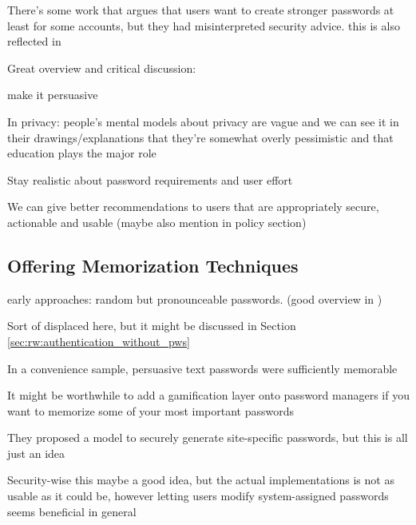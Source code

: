 	There's some work that argues that users want to create stronger passwords at least for some accounts, but they had
	misinterpreted security advice. 
	this is also reflected in \cite{Ur2016PerceptionsPassword}
	
	Great overview and critical discussion: \cite{ZhangKennedy2016RevisitingPasswordRules}
	
	
	make it persuasive \cite{Zakaria2013DesigningEffectiveSecurityMessages}
	
	In privacy: people's mental models about privacy are vague and we can see it in their drawings/explanations that they're somewhat overly pessimistic and that education plays the major role \cite{Kang2015MentalModelsDrawing}
	
	
	Stay realistic about password requirements and user effort \cite{Florencio2016CommACM}
	
	We can give better recommendations to users that are appropriately secure, actionable and usable \cite{ZhangKennedy2016RevisitingPasswordRules} (maybe also mention in policy section)
		
	
	\subsection{Offering Memorization Techniques}
	
	
	early approaches: random but pronounceable passwords. (good overview in \cite{Kuo2006HumanSelectionMnemonic})
	
	\cite{Bonneau2014ReliableStorage56Bits}
	\cite{Forget2007HelpingUsers}
	Sort of displaced here, but it might be discussed in Section \ref{sec:rw:authentication_without_pws} \cite{Forget2015CYOA}
	\cite{Brown2004GeneratingPWs}
	
	In a convenience sample, persuasive text passwords were sufficiently memorable \cite{Forget2008MemorabilityPersuasivePasswords}
	
	It might be worthwhile to add a gamification layer onto password managers if you want to memorize some of your most important passwords \cite{Kroeze2012GamifyingAuthentication}
	
	They proposed a model to securely generate site-specific passwords, but this is all just an idea \cite{Maqbali2016PasswordGenerators}
	
	
	Security-wise this maybe a good idea, but the actual implementations is not as usable as it could be, however letting users modify system-assigned passwords seems beneficial in general \cite{Huha2015UserReplaceablePasswords}
	
